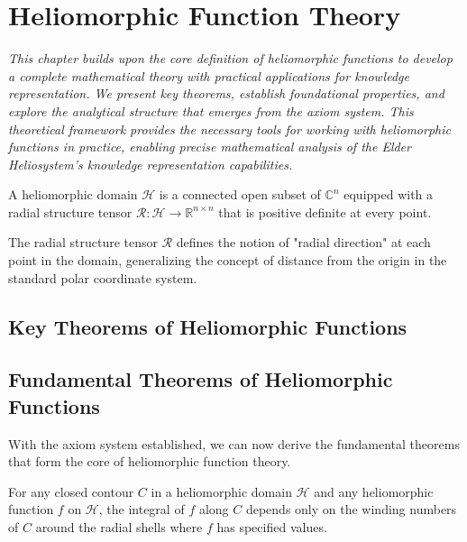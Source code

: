 \chapter{Heliomorphic Function Theory}

\textit{This chapter builds upon the core definition of heliomorphic functions to develop a complete mathematical theory with practical applications for knowledge representation. We present key theorems, establish foundational properties, and explore the analytical structure that emerges from the axiom system. This theoretical framework provides the necessary tools for working with heliomorphic functions in practice, enabling precise mathematical analysis of the Elder Heliosystem's knowledge representation capabilities.}

\begin{definition}
A heliomorphic domain $\mathcal{H}$ is a connected open subset of $\mathbb{C}^n$ equipped with a radial structure tensor $\mathcal{R}: \mathcal{H} \rightarrow \mathbb{R}^{n \times n}$ that is positive definite at every point.
\end{definition}

The radial structure tensor $\mathcal{R}$ defines the notion of "radial direction" at each point in the domain, generalizing the concept of distance from the origin in the standard polar coordinate system.

\section{Key Theorems of Heliomorphic Functions}

\section{Fundamental Theorems of Heliomorphic Functions}

With the axiom system established, we can now derive the fundamental theorems that form the core of heliomorphic function theory.

\begin{theorem}
For any closed contour $C$ in a heliomorphic domain $\mathcal{H}$ and any heliomorphic function $f$ on $\mathcal{H}$, the integral of $f$ along $C$ depends only on the winding numbers of $C$ around the radial shells where $f$ has specified values.
\end{theorem}

